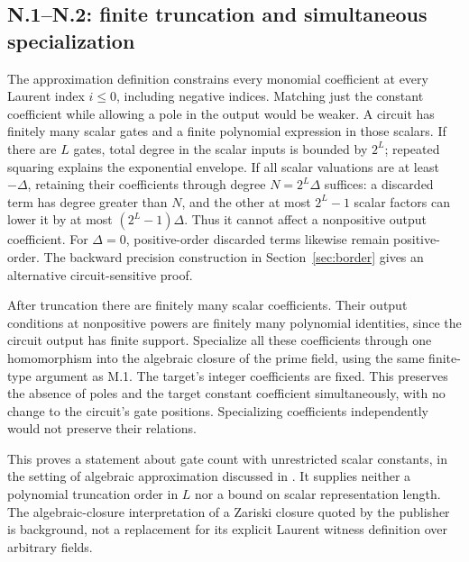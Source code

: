 \documentclass[11pt,letterpaper]{article}
\theoremstyle{definition}\newtheorem{definition}[theorem]{Definition}\newtheorem{example}[theorem]{Example}
\theoremstyle{remark}\newtheorem{remark}[theorem]{Remark}
\begin{document}
\subsection{N.1--N.2: finite truncation and simultaneous specialization}
The approximation definition constrains every monomial coefficient at every Laurent index $i\le0$, including negative indices. Matching just the constant coefficient while allowing a pole in the output would be weaker. A circuit has finitely many scalar gates and a finite polynomial expression in those scalars. If there are $L$ gates, total degree in the scalar inputs is bounded by $2^L$; repeated squaring explains the exponential envelope. If all scalar valuations are at least $-\Delta$, retaining their coefficients through degree $N=2^L\Delta$ suffices: a discarded term has degree greater than $N$, and the other at most $2^L-1$ scalar factors can lower it by at most $(2^L-1)\Delta$. Thus it cannot affect a nonpositive output coefficient. For $\Delta=0$, positive-order discarded terms likewise remain positive-order. The backward precision construction in Section~\ref{sec:border} gives an alternative circuit-sensitive proof.

After truncation there are finitely many scalar coefficients. Their output conditions at nonpositive powers are finitely many polynomial identities, since the circuit output has finite support. Specialize all these coefficients through one homomorphism into the algebraic closure of the prime field, using the same finite-type argument as M.1. The target's integer coefficients are fixed. This preserves the absence of poles and the target constant coefficient simultaneously, with no change to the circuit's gate positions. Specializing coefficients independently would not preserve their relations.

This proves a statement about gate count with unrestricted scalar constants, in the setting of algebraic approximation discussed in \cite{burgisserFactors,ikenmeyerSanyal}. It supplies neither a polynomial truncation order in $L$ nor a bound on scalar representation length. The algebraic-closure interpretation of a Zariski closure quoted by the publisher is background, not a replacement for its explicit Laurent witness definition over arbitrary fields.
\end{document}
